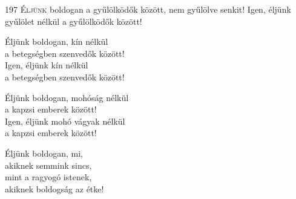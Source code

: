 
\begin{firstdhpverse}[5pt]{197}
\lettrine{É}{ljünk} {\LettrineTextFont boldogan a gyűlölködők között,}\newline
nem gyűlölve senkit!\newline
Igen, éljünk gyűlölet nélkül\newline
a gyűlölködők között!
\end{firstdhpverse}

\begin{dhpverse}

 Éljünk boldogan, kín nélkül\\
a betegségben szenvedők között!\\
Igen, éljünk kín nélkül\\
a betegségben szenvedők között!

 Éljünk boldogan, mohóság nélkül\\
a kapzsi emberek között!\\
Igen, éljünk mohó vágyak nélkül\\
a kapzsi emberek között!

 Éljünk boldogan, mi,\\
akiknek semmink sincs,\\
mint a ragyogó istenek,\\
akiknek boldogság az étke!

\end{dhpverse}
\newpage
